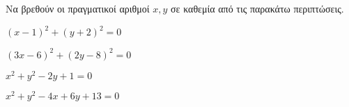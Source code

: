Να βρεθούν οι πραγματικοί αριθμοί $ x,y $ σε καθεμία από τις παρακάτω περιπτώσεις.
\begin{alist}
\item $ (x-1)^2+(y+2)^2=0 $
\item $ (3x-6)^2+(2y-8)^2=0 $
\item $ x^2+y^2-2y+1=0 $
\item $ x^2+y^2-4x+6y+13=0 $
\end{alist}
